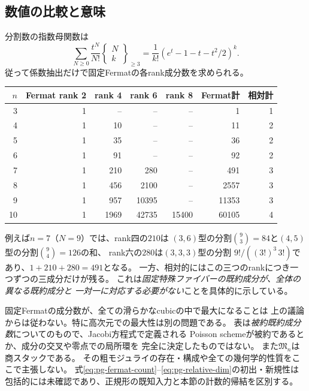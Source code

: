 \subsection{数値の比較と意味}
分割数の指数母関数は
\begin{equation}
\label{eq:pg-fermat-egf}
 \sum_{N\ge0}\frac{t^N}{N!}
 \left\{\begin{smallmatrix}N\\k\end{smallmatrix}\right\}_{\ge3}
 =\frac1{k!}(e^t-1-t-t^2/2)^k.
\end{equation}
従って係数抽出だけで固定Fermatの各rank成分数を求められる。
\begin{center}
\begin{tabular}{r|rrrr|r|r}
\toprule
$n$ & Fermat rank 2 & rank 4 & rank 6 & rank 8
& Fermat計 & 相対計 \\
\midrule
3 & 1 & -- & -- & -- & 1 & 1 \\
4 & 1 & 10 & -- & -- & 11 & 2 \\
5 & 1 & 35 & -- & -- & 36 & 2 \\
6 & 1 & 91 & -- & -- & 92 & 2 \\
7 & 1 & 210 & 280 & -- & 491 & 3 \\
8 & 1 & 456 & 2100 & -- & 2557 & 3 \\
9 & 1 & 957 & 10395 & -- & 11353 & 3 \\
10 & 1 & 1969 & 42735 & 15400 & 60105 & 4 \\
\bottomrule
\end{tabular}
\end{center}
例えば$n=7$（$N=9$）では、rank四の$210$は
$(3,6)$型の分割$\binom93=84$と$(4,5)$型の分割$\binom94=126$の和、
rank六の$280$は$(3,3,3)$型の分割
$9!/((3!)^3\,3!)$であり、$1+210+280=491$となる。
一方、相対的にはこの三つのrankにつき一つずつの三成分だけが残る。
これは\emph{固定特殊ファイバーの既約成分が、全体の異なる既約成分と
一対一に対応する必要がない}ことを具体的に示している。

\begin{remark}
固定Fermatの成分数が、全ての滑らかなcubicの中で最大になることは
上の議論からは従わない。特に高次元での最大性は別の問題である。
表は\emph{被約既約成分数}についてのもので、Jacobi方程式で定義される
Poisson schemeが被約であるとか、成分の交叉や零点での局所環を
完全に決定したものではない。
また$\mathfrak M_n$は商スタックである。
その粗モジュライの存在・構成や全ての幾何学的性質をここで主張しない。
式\eqref{eq:pg-fermat-count}--\eqref{eq:pg-relative-dim}の初出・新規性は
包括的には未確認であり、正規形の既知入力と本節の計数的帰結を区別する。
\end{remark}
